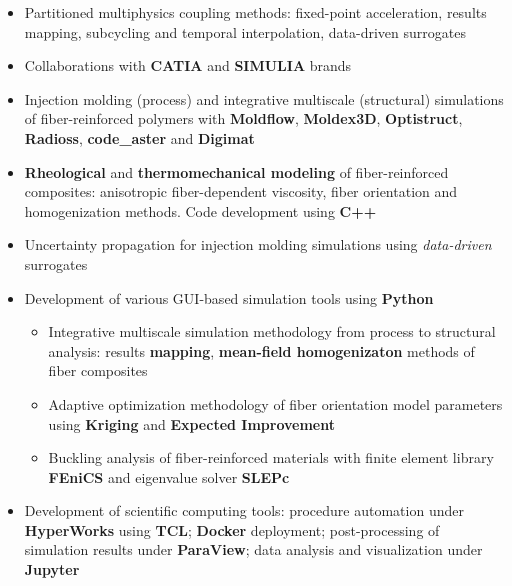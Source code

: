 \documentclass[10pt,a4paper,ragged2e,withhyper]{altacv}
\begin{document}
\begin{paracol}{2}

  \begin{itemize}
    \item Partitioned multiphysics coupling methods: fixed-point acceleration, results mapping, subcycling and temporal interpolation, data-driven surrogates
    \item Collaborations with \textbf{CATIA} and \textbf{SIMULIA} brands
  \end{itemize}

  \divider

  \begin{itemize}
    \item Injection molding (process) and integrative multiscale (structural) simulations of fiber-reinforced polymers with \textbf{Moldflow}, \textbf{Moldex3D}, \textbf{Optistruct}, \textbf{Radioss}, \textbf{code\_aster} and \textbf{Digimat}
    \item \textbf{Rheological} and \textbf{thermomechanical modeling} of fiber-reinforced composites: anisotropic fiber-dependent viscosity, fiber orientation and homogenization methods. Code development using \textbf{C++}
    \item Uncertainty propagation for injection molding simulations using \emph{data-driven} surrogates
    \item Development of various GUI-based simulation tools using \textbf{Python}
      \begin{itemize}
        \item Integrative multiscale simulation methodology from process to structural analysis: results \textbf{mapping}, \textbf{mean-field homogenizaton} methods of fiber composites
        \item Adaptive optimization methodology of fiber orientation model parameters using \textbf{Kriging} and \textbf{Expected Improvement}
        \item Buckling analysis of fiber-reinforced materials with finite element library \textbf{FEniCS} and eigenvalue solver \textbf{SLEPc}
      \end{itemize}
    \item Development of scientific computing tools: procedure automation under \textbf{HyperWorks} using \textbf{TCL}; \textbf{Docker} deployment; post-processing of simulation results under \textbf{ParaView}; data analysis and visualization under \textbf{Jupyter}
  \end{itemize}


\end{paracol}
\end{document}
